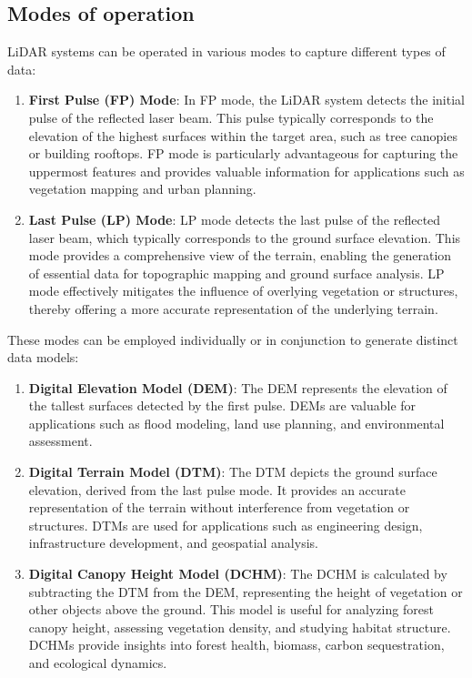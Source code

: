 \documentclass[
  12 pt,
]{Nemilov}
\begin{document}
\subsection{Modes of operation}\label{modes-of-operation}

LiDAR systems can be operated in various modes to capture different types of data:

\begin{enumerate}
\def\labelenumi{\arabic{enumi}.}
\item
  \textbf{First Pulse (FP) Mode}: In FP mode, the LiDAR system detects the initial pulse of the reflected laser beam. This pulse typically corresponds to the elevation of the highest surfaces within the target area, such as tree canopies or building rooftops. FP mode is particularly advantageous for capturing the uppermost features and provides valuable information for applications such as vegetation mapping and urban planning.
\item
  \textbf{Last Pulse (LP) Mode}: LP mode detects the last pulse of the reflected laser beam, which typically corresponds to the ground surface elevation. This mode provides a comprehensive view of the terrain, enabling the generation of essential data for topographic mapping and ground surface analysis. LP mode effectively mitigates the influence of overlying vegetation or structures, thereby offering a more accurate representation of the underlying terrain.
\end{enumerate}

These modes can be employed individually or in conjunction to generate distinct data models:

\begin{enumerate}
\def\labelenumi{\arabic{enumi}.}
\item
  \textbf{Digital Elevation Model (DEM)}: The DEM represents the elevation of the tallest surfaces detected by the first pulse. DEMs are valuable for applications such as flood modeling, land use planning, and environmental assessment.
\item
  \textbf{Digital Terrain Model (DTM)}: The DTM depicts the ground surface elevation, derived from the last pulse mode. It provides an accurate representation of the terrain without interference from vegetation or structures. DTMs are used for applications such as engineering design, infrastructure development, and geospatial analysis.
\item
  \textbf{Digital Canopy Height Model (DCHM)}: The DCHM is calculated by subtracting the DTM from the DEM, representing the height of vegetation or other objects above the ground. This model is useful for analyzing forest canopy height, assessing vegetation density, and studying habitat structure. DCHMs provide insights into forest health, biomass, carbon sequestration, and ecological dynamics.
\end{enumerate}
\end{document}
